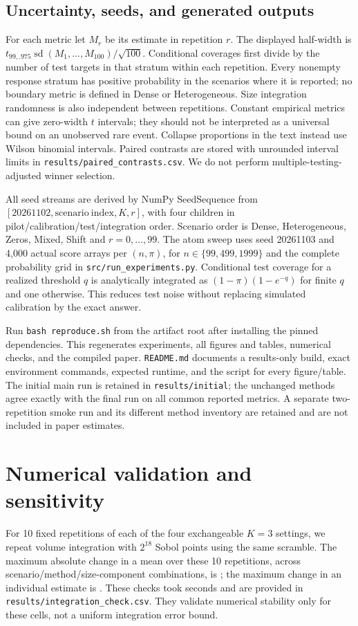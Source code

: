 \documentclass{article}
\begin{document}
\subsection{Uncertainty, seeds, and generated outputs}
For each metric let $M_r$ be its estimate in repetition $r$. The displayed half-width is $t_{99,.975}\operatorname{sd}(M_1,\ldots,M_{100})/\sqrt{100}$. Conditional coverages first divide by the number of test targets in that stratum within each repetition. Every nonempty response stratum has positive probability in the scenarios where it is reported; no boundary metric is defined in Dense or Heterogeneous. Size integration randomness is also independent between repetitions. Constant empirical metrics can give zero-width $t$ intervals; they should not be interpreted as a universal bound on an unobserved rare event. Collapse proportions in the text instead use Wilson binomial intervals. Paired contrasts are stored with unrounded interval limits in \texttt{results/paired\_contrasts.csv}. We do not perform multiple-testing-adjusted winner selection.

All seed streams are derived by NumPy SeedSequence from $[20261102,\mathrm{scenario\ index},K,r]$, with four children in pilot/calibration/test/integration order. Scenario order is Dense, Heterogeneous, Zeros, Mixed, Shift and $r=0,\ldots,99$. The atom sweep uses seed 20261103 and 4,000 actual score arrays per $(n,\pi)$, for $n\in\{99,499,1999\}$ and the complete probability grid in \texttt{src/run\_experiments.py}. Conditional test coverage for a realized threshold $q$ is analytically integrated as $(1-\pi)(1-e^{-q})$ for finite $q$ and one otherwise. This reduces test noise without replacing simulated calibration by the exact answer.

Run \texttt{bash reproduce.sh} from the artifact root after installing the pinned dependencies. This regenerates experiments, all figures and tables, numerical checks, and the compiled paper. \texttt{README.md} documents a results-only build, exact environment commands, expected runtime, and the script for every figure/table. The initial main run is retained in \texttt{results/initial}; the unchanged methods agree exactly with the final run on all common reported metrics. A separate two-repetition smoke run and its different method inventory are retained and are not included in paper estimates.

\section{Numerical validation and sensitivity}
\label{app:checks}
For 10 fixed repetitions of each of the four exchangeable $K=3$ settings, we repeat volume integration with $2^{18}$ Sobol points using the same scramble. The maximum absolute change in a mean over these 10 repetitions, across scenario/method/size-component combinations, is \MaxIntegrationMeanDiff; the maximum change in an individual estimate is \MaxIntegrationSingleDiff. These checks took \CheckSeconds{} seconds and are provided in \texttt{results/integration\_check.csv}. They validate numerical stability only for these cells, not a uniform integration error bound.
\end{document}
